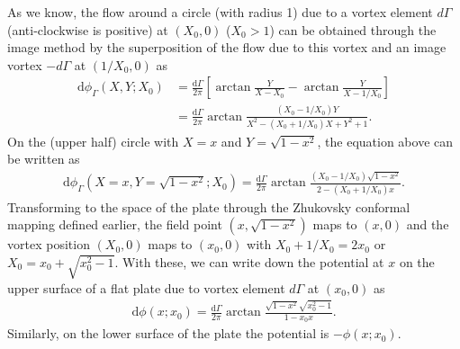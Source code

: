 As we know, the flow around a circle (with radius 1) due to a vortex element $d\Gamma$ (anti-clockwise is positive) at $(X_0, 0)$ ($X_0 > 1$) can be obtained through the image method by the superposition of the flow due to this vortex and an image vortex $-d\Gamma$ at $(1/X_0,0)$ as
\begin{align}
\mathrm{d}\phi_\Gamma (X,Y; X_0) & = \frac{\mathrm{d}\Gamma}{2\pi}[\arctan \frac{Y}{X-X_0} - \arctan \frac{Y}{X-1/X_0}]  \\
            & =  \frac{\mathrm{d}\Gamma}{2\pi}\arctan \frac{(X_0-1/X_0)Y}{X^2-(X_0+1/X_0)X+Y^2+1}.
\end{align}
On the (upper half) circle with $X = x$ and $Y = \sqrt{1-x^2}$, the equation above can be written as
\begin{align}
\mathrm{d}\phi_\Gamma (X = x,Y = \sqrt{1-x^2}; X_0)  =  \frac{\mathrm{d}\Gamma}{2\pi}\arctan \frac{(X_0-1/X_0)\sqrt{1-x^2}}{2-(X_0+1/X_0)x}.
\end{align}
Transforming to the space of the plate through the Zhukovsky conformal mapping defined earlier, the field point $(x, \sqrt{1-x^2})$ maps to $(x, 0)$ and the vortex position $(X_0, 0)$ maps to $(x_0, 0)$ with $X_0 + 1/X_0 = 2x_0$ or $X_0 = x_0 + \sqrt{x_0^2-1}$.
With these, we can write down the potential at $x$ on the upper surface of a flat plate due to vortex element $d\Gamma$ at $(x_0, 0)$ as
\begin{align}
\mathrm{d}\phi (x; x_0) = \frac{\mathrm{d}\Gamma}{2\pi} \arctan \frac{\sqrt{1-x^2}\sqrt{x_0^2-1}}{1-x_0x}.
\end{align}
Similarly, on the lower surface of the plate the potential is $-\phi(x; x_0)$.

